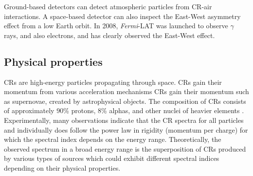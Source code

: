 Ground-based detectors can detect atmospheric particles from
CR-air interactions.
A space-based detector can also inspect the East-West asymmetry
effect from a low Earth orbit. In 2008, \textit{Fermi}-LAT was
launched to observe $\gamma$ rays, and also electrons, and
has clearly observed the East-West effect.


\subsection{Physical properties}
CRs are high-energy particles propagating through
space. CRs gain their momentum from
various acceleration mechanisms CRs gain their momentum
such as supernovae, created by astrophysical objects.
The composition of CRs consists of approximately
90\% protons, 8\% alphas, and other nuclei of heavier
elements \citep{CRComposition2017}. Experimentally,
many observations indicate that the CR spectra for all particles
and individually does follow the power law in rigidity
(momentum per charge)
for which the spectral index depends on the
energy range. Theoretically, the observed spectrum
in a broad energy range
is the superposition of CRs produced by various types of
sources which could exhibit different spectral indices
depending on their physical properties.



